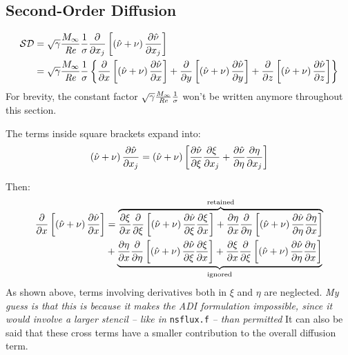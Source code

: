 \documentclass{SelimArticle}
\begin{document}

\subsection{Second-Order Diffusion}
\begin{align*}
    \mathcal{SD} &=  \sqrt{\gamma}\frac{M_\infty}{\mathit{Re}}  \frac{1}{\sigma} \frac{\partial }{\partial x_j} \left[
            \left( \hat{\nu} + \nu \right) \frac{\partial \hat{\nu}}{\partial x_j} 
    \right] \\
    &=  \sqrt{\gamma}\frac{M_\infty}{\mathit{Re}} \frac{1}{\sigma}\left\{
         \frac{\partial }{\partial x} \left[
            \left( \hat{\nu} + \nu \right) \frac{\partial \hat{\nu}}{\partial x} 
        \right]
        +
         \frac{\partial }{\partial y} \left[
            \left( \hat{\nu} + \nu \right) \frac{\partial \hat{\nu}}{\partial y} 
        \right]
        +
         \frac{\partial }{\partial z} \left[
            \left( \hat{\nu} + \nu \right) \frac{\partial \hat{\nu}}{\partial z} 
        \right]
    \right\}
\end{align*}
For brevity, the constant factor $ \sqrt{\gamma}\frac{M_\infty}{\mathit{Re}}  \frac{1}{\sigma}$ won't be written anymore throughout
this section.

The terms inside square brackets expand into:
\newcommand{\qdiff}[4]{\ensuremath{
    \diff{#1}{#2}\diff{#3}{#4}
}}
\newcommand{\sanu}{\ensuremath{\left( \sa + \nu \right)}}
$$
    \sanu\diff{\sa}{x_j} = \left( \sa + \nu \right)\left[
        \qdiff{\sa}{\xi}{\xi}{x_j} + \qdiff{\sa}{\eta}{\eta}{x_j}
    \right]
$$

Then:
\begin{align*}
  \diff{}{x}\left[
      \left( \sa + \nu \right)\diff{\sa}{x}
  \right]
  &= \overbrace{
      \qdiff{\xi}{x}{}{\xi}\left[ \sanu \qdiff{\sa}{\xi}{\xi}{x} \right]
    + \qdiff{\eta}{x}{}{\eta}\left[ \sanu \qdiff{\sa}{\eta}{\eta}{x} \right]
  }^{\text{retained}}
  \\
  &+ \underbrace{
       \qdiff{\eta}{x}{}{\eta}\left[ \sanu \qdiff{\sa}{\xi}{\xi}{x} \right]
      + \qdiff{\xi}{x}{}{\xi}\left[ \sanu \qdiff{\sa}{\eta}{\eta}{x} \right]
  }_{\text{ignored}}
\end{align*}
As shown above, terms involving derivatives both in $\xi$ and $\eta$ are neglected. \textit{
My guess is that this is because it makes the ADI formulation impossible, since it would involve
a larger stencil -- like in }\texttt{nsflux.f}\textit{ -- than permitted} It can also be said that
these cross terms have a smaller contribution to the overall diffusion term.
\end{document}
